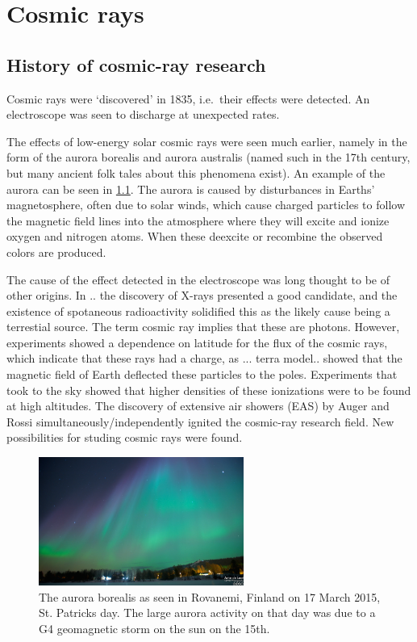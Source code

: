 \chapter{Cosmic rays}
\label{ch:cosmic-rays}


\section{History of cosmic-ray research}

Cosmic rays were `discovered' in 1835, i.e.\ their effects were detected. An electroscope was seen to discharge at unexpected rates.

The effects of low-energy solar cosmic rays were seen much earlier, namely in the form of the aurora borealis and aurora australis (named such in the 17th century, but many ancient folk tales about this phenomena exist). An example of the aurora can be seen in \cref{fig:aurora}. The aurora is caused by disturbances in Earths' magnetosphere, often due to solar winds, which cause charged particles to follow the magnetic field lines into the atmosphere where they will excite and ionize oxygen and nitrogen atoms. When these deexcite or recombine the observed colors are produced.

The cause of the effect detected in the electroscope was long thought to be of other origins. In .. the discovery of X-rays presented a good candidate, and the existence of  spotaneous radioactivity solidified this as the likely cause being a terrestial source. The term cosmic ray implies that these are photons. However, experiments showed a dependence on latitude for the flux of the cosmic rays, which indicate that these rays had a charge, as ... terra model.. showed that the magnetic field of Earth deflected these particles to the poles. Experiments that took to the sky showed that higher densities of these ionizations were to be found at high altitudes. The discovery of extensive air showers (EAS) by Auger and Rossi simultaneously/independently ignited the cosmic-ray research field. New possibilities for studing cosmic rays were found.

\begin{figure}
    \centering
    \includegraphics[width=0.6\textwidth]{plots/cosmic-rays/aurora.png}
    \caption{The aurora borealis as seen in Rovanemi, Finland on 17 March 2015, St. Patricks day. The large aurora activity on that day was due to a G4 geomagnetic storm on the sun on the 15th.}
    \label{fig:aurora}
\end{figure}


